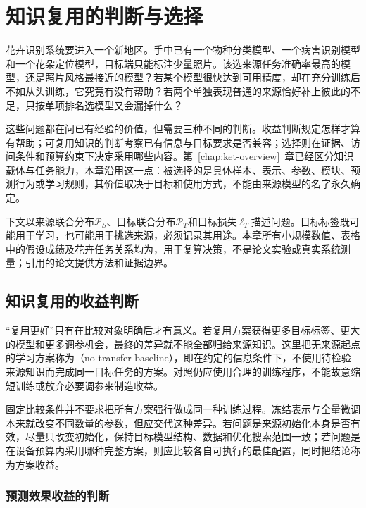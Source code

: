 \chapter{知识复用的判断与选择}
\label{chap:ket-reuse-selection}

花卉识别系统要进入一个新地区。手中已有一个物种分类模型、一个病害识别模型和一个花朵定位模型，目标端只能标注少量照片。该选来源任务准确率最高的模型，还是照片风格最接近的模型？若某个模型很快达到可用精度，却在充分训练后不如从头训练，它究竟有没有帮助？若两个单独表现普通的来源恰好补上彼此的不足，只按单项排名选模型又会漏掉什么？

这些问题都在问已有经验的价值，但需要三种不同的判断。收益判断规定怎样才算有帮助；可复用知识的判断考察已有信息与目标要求是否兼容；选择则在证据、访问条件和预算约束下决定采用哪些内容。第~\ref{chap:ket-overview}~章已经区分知识载体与任务能力，本章沿用这一点：被选择的是具体样本、表示、参数、模块、预测行为或学习规则，其价值取决于目标和使用方式，不能由来源模型的名字永久确定。

下文以来源联合分布$\mathcal P_S$、目标联合分布$\mathcal P_T$和目标损失$\ell_T$描述问题。目标标签既可能用于学习，也可能用于挑选来源，必须记录其用途。本章所有小规模数值、表格中的假设成绩及花卉任务关系均为，用于复算决策，不是论文实验或真实系统测量；引用的论文提供方法和证据边界。

\section{知识复用的收益判断}
\label{sec:ket-reuse-benefits}

“复用更好”只有在比较对象明确后才有意义。若复用方案获得更多目标标签、更大的模型和更多调参机会，最终的差异就不能全部归给来源知识。这里把无来源起点的学习方案称为（no-transfer baseline），即在约定的信息条件下，不使用待检验来源知识而完成同一目标任务的方案。对照仍应使用合理的训练程序，不能故意缩短训练或放弃必要调参来制造收益。

固定比较条件并不要求把所有方案强行做成同一种训练过程。冻结表示与全量微调本来就改变不同数量的参数，但应交代这种差异。若问题是来源初始化本身是否有效，尽量只改变初始化，保持目标模型结构、数据和优化搜索范围一致；若问题是在设备预算内采用哪种完整方案，则应比较各自可执行的最佳配置，同时把结论称为方案收益。

\subsection{预测效果收益的判断}
\label{sec:ket-reuse-prediction}

